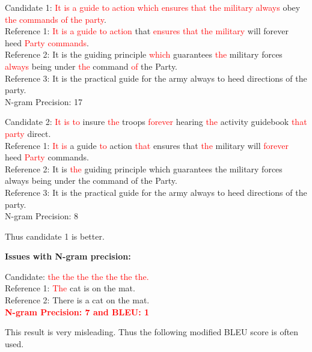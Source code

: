 \documentclass[a4paper]{article}
\newcommand{\red}[1]{\textcolor{red}{#1}}
\begin{document}
Candidate  1:  \red{It is  a  guide to action which  ensures  that  the military
always} obey \red{the commands of the party}. \\
Reference 1: \red{It is a guide  to action} that \red{ensures that the military}
will forever heed \red{Party commands}. \\
Reference  2:  It  is  the  guiding principle  \red{which}  guarantees \red{the}
military forces \red{always}  being under  \red{the} command \red{of} the Party.
\\
Reference 3: It is the practical guide for the army always to heed directions of
the party. \\
N-gram Precision: 17

Candidate 2: \red{It is to} insure \red {the} troops \red {forever} hearing \red
{the} activity guidebook \red{that party} direct. \\
Reference 1: \red {It is} a guide \red {to} action \red {that} ensures that \red
{the} military will  \red{forever} heed \red{Party} commands. \\ Reference 2: It
is \red{the} guiding principle which guarantees the
military forces always being under the command of the Party. \\ Reference 3:  It
is the practical guide for the army always to heed directions of the party. \\
N-gram Precision: 8

Thus candidate 1 is better.

\textbf{Issues with N-gram precision:}

Candidate: \red{the the the the the the the.} \\
Reference 1: \red{The} cat is on the mat. \\
Reference 2: There is a cat on the mat. \\

\textbf{\red{N-gram Precision: 7 and BLEU: 1}}

This result is  very misleading. Thus the following modified BLEU score is often
used.
\end{document}
